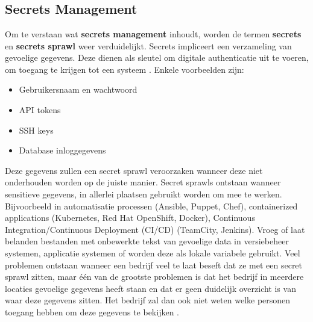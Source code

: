 \chapter{}
\label{ch:stand-van-zaken}



\section{Secrets Management}
\label{sec:secrets management}
Om te verstaan wat \textbf{secrets management} inhoudt, worden de termen \textbf{secrets} en \textbf{secrets sprawl} weer verduidelijkt. Secrets impliceert een verzameling van gevoelige gegevens. Deze dienen als sleutel om digitale authenticatie uit te voeren, om toegang te krijgen tot een systeem \autocite{Dadgar2018}. Enkele voorbeelden zijn:

\begin{itemize}
    \item Gebruikersnaam en wachtwoord
    \item API tokens
    \item SSH keys
    \item Database inloggegevens
\end{itemize}

Deze gegevens zullen een secret sprawl veroorzaken wanneer deze niet onderhouden worden op de juiste manier. Secret sprawls ontstaan wanneer sensitieve gegevens, in allerlei plaatsen gebruikt worden om mee te werken. Bijvoorbeeld in automatisatie processen (Ansible, Puppet, Chef), containerized applications (Kubernetes, Red Hat OpenShift, Docker), Continuous Integration/Continuous Deployment (CI/CD) (TeamCity, Jenkins). Vroeg of laat belanden bestanden met onbewerkte tekst van gevoelige data in versiebeheer systemen, applicatie systemen of worden deze als lokale variabele gebruikt. Veel problemen ontstaan wanneer een bedrijf veel te laat beseft dat ze met een secret sprawl zitten, maar één van de grootste problemen is dat het bedrijf in meerdere locaties gevoelige gegevens heeft staan en dat er geen duidelijk overzicht is van waar deze gegevens zitten. Het bedrijf zal dan ook niet weten welke personen toegang hebben om deze gegevens te bekijken \autocite{Tozzi2020} \autocite{Dadgar2018}. 
\newline 



